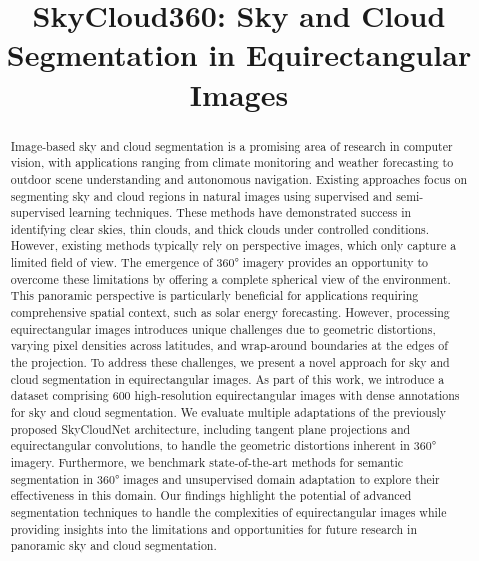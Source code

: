 \documentclass[conference]{IEEEtran}
\begin{document}

\title{SkyCloud360: Sky and Cloud Segmentation in Equirectangular Images} %

\author{
\and
{}
}

\maketitle
\thispagestyle{empty}

\begin{abstract}
\noindent 
Image-based sky and cloud segmentation is a promising area of research in computer vision, with applications ranging from climate monitoring and weather forecasting to outdoor scene understanding and autonomous navigation. 
Existing approaches focus on segmenting sky and cloud regions in natural images using supervised and semi-supervised learning techniques.
These methods have demonstrated success in identifying clear skies, thin clouds, and thick clouds under controlled conditions. However, existing methods typically rely on perspective images, which only capture a limited field of view.
The emergence of 360° imagery provides an opportunity to overcome these limitations by offering a complete spherical view of the environment. 
This panoramic perspective is particularly beneficial for applications requiring comprehensive spatial context, such as solar energy forecasting.
However, processing equirectangular images introduces unique challenges due to geometric distortions, varying pixel densities across latitudes, and wrap-around boundaries at the edges of the projection.
To address these challenges, we present a novel approach for sky and cloud segmentation in equirectangular images. 
As part of this work, we introduce a dataset comprising 600 high-resolution equirectangular images with dense annotations for sky and cloud segmentation. We evaluate multiple adaptations of the previously proposed SkyCloudNet architecture, including tangent plane projections and equirectangular convolutions, to handle the geometric distortions inherent in 360° imagery. Furthermore, we benchmark state-of-the-art methods for semantic segmentation in 360° images and unsupervised domain adaptation to explore their effectiveness in this domain.
Our findings highlight the potential of advanced segmentation techniques to handle the complexities of equirectangular images while providing insights into the limitations and opportunities for future research in panoramic sky and cloud segmentation.
\end{abstract}
\end{document}
